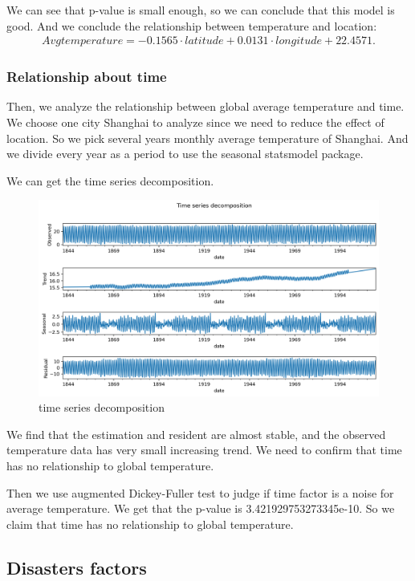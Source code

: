 \documentclass{apmcmthesis}
\begin{document}
  We can see that p-value is small enough, so we can conclude that this model is good.
  And we conclude the relationship between temperature and location:
  \begin{align*}
    Avgtemperature =-0.1565\cdot latitude+0.0131\cdot longitude + 22.4571.
  \end{align*}
  
  \subsubsection{Relationship about time}
  Then, we analyze the relationship between global average temperature and time.
  We choose one city Shanghai to analyze since we need to reduce the effect of location.
  So we pick several years monthly average temperature of Shanghai.
  And we divide every year as a period to use the seasonal statsmodel package.
  
  We can get the time series decomposition.
  
  \begin{figure}[htbp]
    \centering
    \includegraphics[scale=0.5]{seasonal.png}
    \caption{time series decomposition}
  \end{figure}
  
  We find that the estimation and resident are almost stable, and the observed temperature data has very small increasing trend. 
  We need to confirm that time has no relationship to global temperature.
  
  Then we use augmented Dickey-Fuller test to judge if time factor is a noise for average temperature.
  We get that the p-value is 3.421929753273345e-10.
  So we claim that time has no relationship to global temperature.
  
  
  \subsection{Disasters factors}
  
\end{document}
